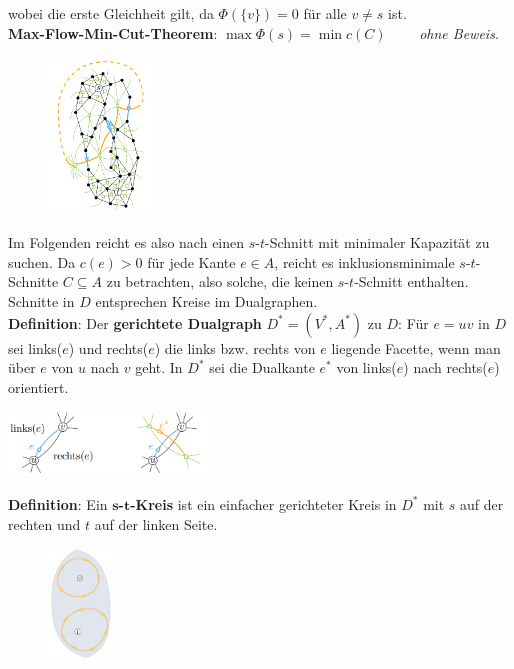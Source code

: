wobei die erste Gleichheit gilt, da $\Phi(\{v\})=0$ für alle $v\neq s$ ist.\\

\textbf{Max-Flow-Min-Cut-Theorem}: $\max\Phi(s)=\min c(C)\qquad$ \textit{ohne Beweis.}\\
\begin{figure}
	\centering
	\vspace{-20pt}
	\includegraphics[width=0.25\textwidth]{images/cut-circ.png}
	\vspace{40pt}
	\vspace{-80pt}
\end{figure}
Im Folgenden reicht es also nach einen $s$-$t$-Schnitt mit minimaler Kapazität zu suchen. Da $c(e)>0$ für jede Kante $e\in A$, reicht es inklusionsminimale $s$-$t$-Schnitte $C\subseteq A$ zu betrachten, also solche, die keinen $s$-$t$-Schnitt enthalten. Schnitte in $D$ entsprechen Kreise im Dualgraphen.\\

\textbf{Definition}: Der \textbf{gerichtete Dualgraph} $D^*=(V^*,A^*)$ zu $D$: Für $e=uv$ in $D$ sei links($e$) und rechts($e$) die links bzw. rechts von $e$ liegende Facette, wenn man über $e$ von $u$ nach $v$ geht. In $D^*$ sei die Dualkante $e^*$ von links($e$) nach rechts($e$) orientiert.
\begin{center}
	\includegraphics[width=0.4\textwidth]{images/dir-dual.png}
\end{center}
\bigskip
\textbf{Definition}: Ein \textbf{$\boldsymbol{s}$-$\boldsymbol{t}$-Kreis} ist ein einfacher gerichteter Kreis in $D^*$ mit $s$ auf der rechten und $t$ auf der linken Seite.

\begin{figure}
	\centering
	\vspace{-35pt}
	\includegraphics[width=0.15\textwidth]{images/s-t-circ.png}
	\vspace{30pt}
	\vspace{-80pt}
\end{figure}

